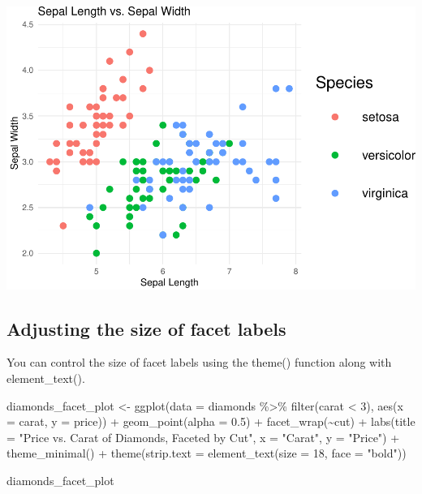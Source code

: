 \documentclass[
]{book}
\newenvironment{Shaded}{\begin{snugshade}}{\end{snugshade}}
\newcommand{\AttributeTok}[1]{\textcolor[rgb]{0.77,0.63,0.00}{#1}}
\newcommand{\DecValTok}[1]{\textcolor[rgb]{0.00,0.00,0.81}{#1}}
\newcommand{\FloatTok}[1]{\textcolor[rgb]{0.00,0.00,0.81}{#1}}
\newcommand{\FunctionTok}[1]{\textcolor[rgb]{0.00,0.00,0.00}{#1}}
\newcommand{\NormalTok}[1]{#1}
\newcommand{\OtherTok}[1]{\textcolor[rgb]{0.56,0.35,0.01}{#1}}
\newcommand{\SpecialCharTok}[1]{\textcolor[rgb]{0.00,0.00,0.00}{#1}}
\newcommand{\StringTok}[1]{\textcolor[rgb]{0.31,0.60,0.02}{#1}}
\begin{document}
\includegraphics[width=1\linewidth]{graphformatting_files/figure-latex/unnamed-chunk-11-1}

\hypertarget{adjusting-the-size-of-facet-labels}{%
\subsection{Adjusting the size of facet labels}\label{adjusting-the-size-of-facet-labels}}

You can control the size of facet labels using the theme() function along with element\_text().

\begin{Shaded}
\begin{Highlighting}[]
\NormalTok{diamonds\_facet\_plot }\OtherTok{\textless{}{-}} \FunctionTok{ggplot}\NormalTok{(}\AttributeTok{data =}\NormalTok{ diamonds }\SpecialCharTok{\%\textgreater{}\%} \FunctionTok{filter}\NormalTok{(carat }\SpecialCharTok{\textless{}} \DecValTok{3}\NormalTok{), }\FunctionTok{aes}\NormalTok{(}\AttributeTok{x =}\NormalTok{ carat, }\AttributeTok{y =}\NormalTok{ price)) }\SpecialCharTok{+}
\FunctionTok{geom\_point}\NormalTok{(}\AttributeTok{alpha =} \FloatTok{0.5}\NormalTok{) }\SpecialCharTok{+}
\FunctionTok{facet\_wrap}\NormalTok{(}\SpecialCharTok{\textasciitilde{}}\NormalTok{cut) }\SpecialCharTok{+}
\FunctionTok{labs}\NormalTok{(}\AttributeTok{title =} \StringTok{"Price vs. Carat of Diamonds, Faceted by Cut"}\NormalTok{,}
\AttributeTok{x =} \StringTok{"Carat"}\NormalTok{,}
\AttributeTok{y =} \StringTok{"Price"}\NormalTok{) }\SpecialCharTok{+}
\FunctionTok{theme\_minimal}\NormalTok{() }\SpecialCharTok{+}
\FunctionTok{theme}\NormalTok{(}\AttributeTok{strip.text =} \FunctionTok{element\_text}\NormalTok{(}\AttributeTok{size =} \DecValTok{18}\NormalTok{, }\AttributeTok{face =} \StringTok{"bold"}\NormalTok{))}

\NormalTok{diamonds\_facet\_plot}
\end{Highlighting}
\end{Shaded}
\end{document}
